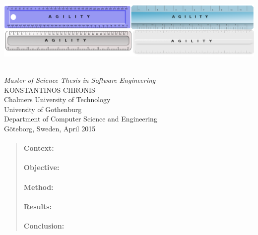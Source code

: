 \begin{titlepage}

\mbox{}
\vfill
\addtolength{\voffset}{2cm}

\includegraphics[scale=0.3]{fig/auxiliary/cover.png}
	
\begin{flushleft}
	{ \\[0.5cm]
\emph{\Large Master of Science Thesis in Software Engineering} \\[.8cm]
	
	{\huge KONSTANTINOS CHRONIS}\\[.8cm]
	
	{\Large Chalmers University of Technology \\
    University of Gothenburg} \\
     Department of Computer Science and Engineering \\
     Göteborg, Sweden,  April 2015
  } 
	
\end{flushleft}

\end{titlepage}
\ClearShipoutPicture

\pagestyle{empty}
\newpage
\clearpage
\mbox{}
\newpage
\clearpage
\thispagestyle{empty}

\begin{abstract}
\paragraph{Context:} 

\paragraph{Objective:} 
 
\paragraph{Method:} 

\paragraph{Results:} 

\paragraph{Conclusion:} 
\end{abstract}

